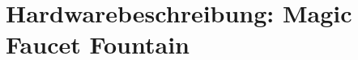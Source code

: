 \documentclass[10pt,a4paper,bibliography=totoc]{scrbook}
\begin{document}
{{  %








  













  
  
}


\part{Hardwarebeschreibung: Magic Faucet Fountain}

\label{part:Teil3}
  	
  	
  	
  	
  	
  	
  	
  	

}
\end{document}
